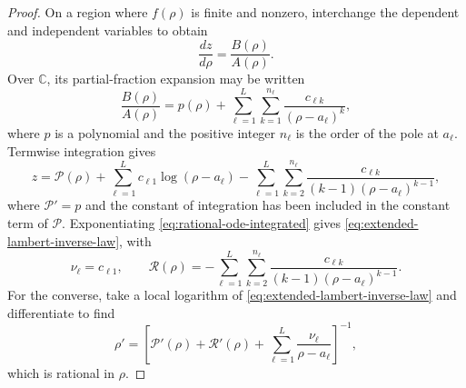 \documentclass[11pt,a4paper]{article}
\numberwithin{equation}{section}
\begin{document}
\begin{proof}
On a region where $f(\rho)$ is finite and nonzero, interchange the dependent and independent variables to obtain
\begin{equation}
    \frac{dz}{d\rho}=\frac{B(\rho)}{A(\rho)}.
\end{equation}
Over $\mathbb{C}$, its partial-fraction expansion may be written
\begin{equation}
    \frac{B(\rho)}{A(\rho)}
    =p(\rho)
    +\sum_{\ell=1}^{L}\sum_{k=1}^{n_\ell}
    \frac{c_{\ell k}}{(\rho-a_\ell)^k},
    \label{eq:rational-ode-partial-fractions}
\end{equation}
where $p$ is a polynomial and the positive integer $n_\ell$ is the order of the pole at $a_\ell$.
Termwise integration gives
\begin{equation}
    z
    =\mathcal{P}(\rho)
    +\sum_{\ell=1}^{L}c_{\ell1}\log(\rho-a_\ell)
    -\sum_{\ell=1}^{L}\sum_{k=2}^{n_\ell}
    \frac{c_{\ell k}}{(k-1)(\rho-a_\ell)^{k-1}},
    \label{eq:rational-ode-integrated}
\end{equation}
where $\mathcal{P}'=p$ and the constant of integration has been included in the constant term of $\mathcal{P}$.
Exponentiating \eqref{eq:rational-ode-integrated} gives \eqref{eq:extended-lambert-inverse-law}, with
\begin{equation}
    \nu_\ell=c_{\ell1},
    \qquad
    \mathcal{R}(\rho)
    =-\sum_{\ell=1}^{L}\sum_{k=2}^{n_\ell}
    \frac{c_{\ell k}}{(k-1)(\rho-a_\ell)^{k-1}}.
\end{equation}
For the converse, take a local logarithm of \eqref{eq:extended-lambert-inverse-law} and differentiate to find
\begin{equation}
    \rho'
    =\left[
        \mathcal{P}'(\rho)
        +\mathcal{R}'(\rho)
        +\sum_{\ell=1}^{L}\frac{\nu_\ell}{\rho-a_\ell}
    \right]^{-1},
    \label{eq:extended-lambert-rational-ode}
\end{equation}
which is rational in $\rho$.
\end{proof}
\end{document}
